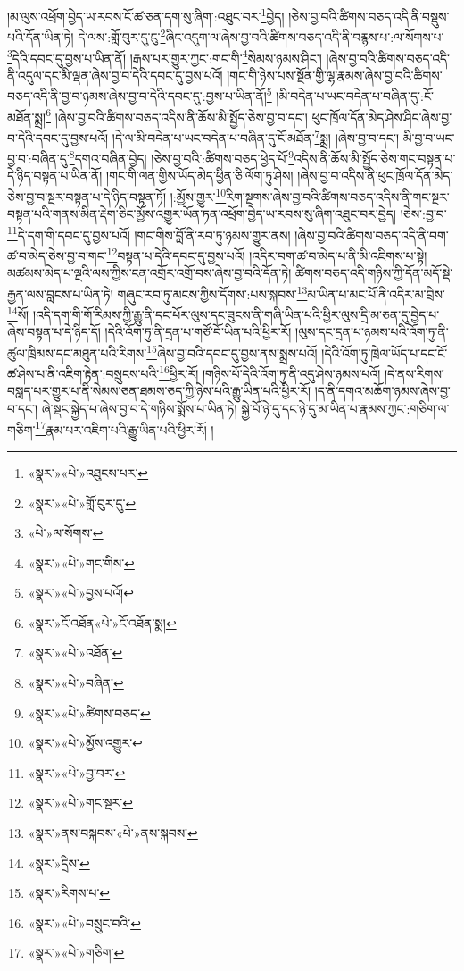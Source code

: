 །མ་ལུས་འཕྲོག་བྱེད་ཡ་རབས་ངོ་ཚ་ཅན་དག་སུ་ཞིག་:འཐུང་བར་\footnote{«སྣར་»«པེ་»འཐུངས་པར་}བྱེད། །ཅེས་བྱ་བའི་ཚིགས་བཅད་འདི་ནི་བསྡུས་པའི་དོན་ཡིན་ཏེ། དེ་ལས་:གློ་བུར་དུ་ངུ་\footnote{«སྣར་»«པེ་»གློ་བུར་དུ་}ཞིང་འདུག་ལ་ཞེས་བྱ་བའི་ཚིགས་བཅད་འདི་ནི་བརྙས་པ་:ལ་སོགས་པ་\footnote{«པེ་»ལ་སོགས་}དེའི་དབང་དུ་བྱས་པ་ཡིན་ནོ། །རྒས་པར་གྱུར་ཀྱང་:གང་གི་\footnote{«སྣར་»«པེ་»གང་གིས་}སེམས་ཉམས་ཤིང་། །ཞེས་བྱ་བའི་ཚིགས་བཅད་འདི་ནི་འདུལ་དང་མི་ལྡན་ཞེས་བྱ་བ་དེའི་དབང་དུ་བྱས་པའོ། །གང་གི་ཉེས་པས་སྔོན་གྱི་ལྷ་རྣམས་ཞེས་བྱ་བའི་ཚིགས་བཅད་འདི་ནི་བྱ་བ་ཉམས་ཞེས་བྱ་བ་དེའི་དབང་དུ་:བྱས་པ་ཡིན་ནོ།\footnote{«སྣར་»«པེ་»བྱས་པའོ།} །མི་བདེན་པ་ཡང་བདེན་པ་བཞིན་དུ་:ངོ་མཐོན་སྨྲ།\footnote{«སྣར་»ངོ་འཐོན«པེ་»ངོ་འཐོན་སྨ།} །ཞེས་བྱ་བའི་ཚིགས་བཅད་འདིས་ནི་ཆོས་མི་སྤྱོད་ཅེས་བྱ་བ་དང་། ཕུང་ཁྲོལ་དོན་མེད་ཤེས་ཤིང་ཞེས་བྱ་བ་དེའི་དབང་དུ་བྱས་པའོ། །དེ་ལ་མི་བདེན་པ་ཡང་བདེན་པ་བཞིན་དུ་ངོ་མཐོན་\footnote{«སྣར་»«པེ་»འཐོན་}སྨྲ། །ཞེས་བྱ་བ་དང་། མི་བྱ་བ་ཡང་བྱ་བ་:བཞིན་དུ་\footnote{«སྣར་»«པེ་»བཞིན་}དགའ་བཞིན་བྱེད། །ཅེས་བྱ་བའི་:ཚིགས་བཅད་ཕྱེད་པོ་\footnote{«སྣར་»«པེ་»ཚིགས་བཅད་}འདིས་ནི་ཆོས་མི་སྤྱོད་ཅེས་གང་བསྟན་པ་དེ་ཉིད་བསྟན་པ་ཡིན་ནོ། །གང་གི་ལན་གྱིས་ཡོད་མེད་ཕྱིན་ཅི་ལོག་ཏུ་ཤེས། །ཞེས་བྱ་བ་འདིས་ནི་ཕུང་ཁྲོལ་དོན་མེད་ཅེས་བྱ་བ་སྔར་བསྟན་པ་དེ་ཉིད་བསྟན་ཏོ། །:མྱོས་གྱུར་\footnote{«སྣར་»«པེ་»མྱོས་འགྱུར་}རིག་སྔགས་ཞེས་བྱ་བའི་ཚིགས་བཅད་འདིས་ནི་གང་སྔར་བསྟན་པའི་གནས་མིན་རྡེག་ཅིང་མྱོས་འགྱུར་ཡོན་ཏན་འཕྲོག་བྱེད་ཡ་རབས་སུ་ཞིག་འཐུང་བར་བྱེད། །ཅེས་:བྱ་བ་\footnote{«སྣར་»«པེ་»བྱ་བར་}དེ་དག་གི་དབང་དུ་བྱས་པའོ། །གང་གིས་བློ་ནི་རབ་ཏུ་ཉམས་གྱུར་ནས། །ཞེས་བྱ་བའི་ཚིགས་བཅད་འདི་ནི་བག་ཚ་བ་མེད་ཅེས་བྱ་བ་གང་\footnote{«སྣར་»«པེ་»གང་སྔར་}བསྟན་པ་དེའི་དབང་དུ་བྱས་པའོ། །འདིར་བག་ཚ་བ་མེད་པ་ནི་མི་འཇིགས་པ་སྟེ། མཚམས་མེད་པ་ལྔའི་ལས་ཀྱིས་ངན་འགྲོར་འགྲོ་བས་ཞེས་བྱ་བའི་དོན་ཏེ། ཚིགས་བཅད་འདི་གཉིས་ཀྱི་དོན་མདོ་སྡེ་རྒྱན་ལས་བླངས་པ་ཡིན་ཏེ། གཞུང་རབ་ཏུ་མངས་ཀྱིས་དོགས་:པས་སྐབས་\footnote{«སྣར་»ནས་བསྐབས་«པེ་»ནས་སྐབས་}མ་ཡིན་པ་མང་པོ་ནི་འདིར་མ་བྲིས་\footnote{«སྣར་»དྲིས་}སོ། །འདི་དག་གི་གོ་རིམས་ཀྱི་རྒྱུ་ནི་དང་པོར་ལུས་དང་ཟུངས་ནི་གཞི་ཡིན་པའི་ཕྱིར་ལུས་དྲི་མ་ཅན་དུ་བྱེད་པ་ཞེས་བསྟན་པ་དེ་ཉིད་དོ། །དེའི་འོག་ཏུ་ནི་དྲན་པ་གཙོ་བོ་ཡིན་པའི་ཕྱིར་རོ། །ལུས་དང་དྲན་པ་ཉམས་པའི་འོག་ཏུ་ནི་ཚུལ་ཁྲིམས་དང་མཐུན་པའི་རིགས་\footnote{«སྣར་»རིགས་པ་}ཞེས་བྱ་བའི་དབང་དུ་བྱས་ནས་སྨྲས་པའོ། །དེའི་འོག་ཏུ་ཁྲེལ་ཡོད་པ་དང་ངོ་ཚ་ཤེས་པ་ནི་འཇིག་རྟེན་:བསྲུངས་པའི་\footnote{«སྣར་»«པེ་»བསྲུང་བའི་}ཕྱིར་རོ། །གཉིས་པོ་དེའི་འོག་ཏུ་ནི་འདུ་ཤེས་ཉམས་པའོ། །དེ་ནས་རིགས་བསླད་པར་གྱུར་པ་ནི་སེམས་ཅན་ཐམས་ཅད་ཀྱི་ཉེས་པའི་རྒྱུ་ཡིན་པའི་ཕྱིར་རོ། །ད་ནི་དགའ་མཆོག་ཉམས་ཞེས་བྱ་བ་དང་། ཞེ་སྡང་སྐྱེད་པ་ཞེས་བྱ་བ་དེ་གཉིས་སྨོས་པ་ཡིན་ཏེ། སྐྱེ་བོ་ཉེ་དུ་དང་ཉེ་དུ་མ་ཡིན་པ་རྣམས་ཀྱང་:གཅིག་ལ་གཅིག་\footnote{«སྣར་»«པེ་»གཅིག་}རྣམ་པར་འཇིག་པའི་རྒྱུ་ཡིན་པའི་ཕྱིར་རོ། །
